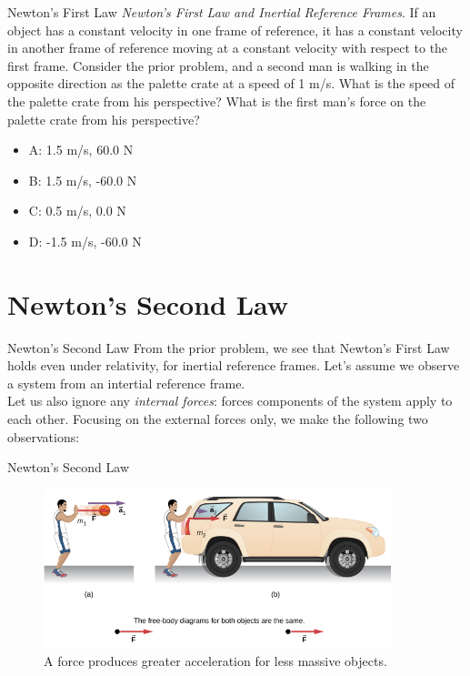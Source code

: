 \documentclass{beamer}
\begin{document}
\begin{frame}{Newton's First Law}
\small
\textit{Newton's First Law and Inertial Reference Frames}.  If an object has a constant velocity in one frame of reference, it has a constant velocity in another frame of reference moving at a constant velocity with respect to the first frame.  Consider the prior problem, and a second man is walking in the opposite direction as the palette crate at a speed of 1 m/s.  What is the speed of the palette crate from his perspective?  What is the first man's force on the palette crate from his perspective?
\begin{itemize}
\item A: 1.5 m/s, 60.0 N
\item B: 1.5 m/s, -60.0 N
\item C: 0.5 m/s, 0.0 N 
\item D: -1.5 m/s, -60.0 N
\end{itemize}
\end{frame}

\section{Newton's Second Law}

\begin{frame}{Newton's Second Law}
From the prior problem, we see that \alert{Newton's First Law} holds even under relativity, for inertial reference frames.  Let's assume we observe a system from an intertial reference frame. \\
\vspace{0.5cm}
Let us also ignore any \textit{internal forces}: forces components of the system apply to each other.  Focusing on the external forces only, we make the following two observations: \\
\end{frame}

\begin{frame}{Newton's Second Law}
\begin{figure}
\centering
\includegraphics[width=0.9\textwidth]{figures/NewtonsSecond.png}
\caption{\label{fig:newton1} A force produces greater acceleration for less massive objects.}
\end{figure}
\end{frame}
\end{document}

